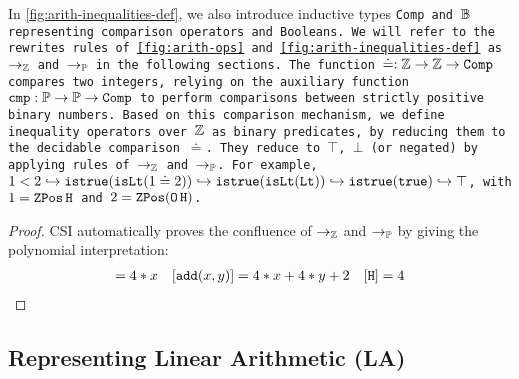 In \cref{fig:arith-inequalities-def}, we also introduce inductive types \tt{Comp}  and $\B$ representing comparison operators and Booleans.
We will refer to the rewrites rules of \cref{fig:arith-ops} and \cref{fig:arith-inequalities-def} as $\ra_\Z$ and $\ra_\bb{P}$ in the following sections.
The function $\doteq : \Z \to \Z \to \texttt{Comp}$ compares two integers, relying on the auxiliary function $\texttt{cmp} : \bb{P} \to \bb{P} \to \texttt{Comp}$ to perform comparisons between strictly positive binary numbers.
Based on this comparison mechanism, we define inequality operators over $\Z$ as binary predicates, by reducing them to the decidable comparison $\doteq$. They reduce to $\top$, $\bot$ (or negated) by applying rules of $\ra_\Z$ and $\ra_\bb{P}$.
For example, $1 < 2 \hookrightarrow \tt{istrue}(\tt{isLt}(1 \doteq 2)) \hookrightarrow \tt{istrue}(\tt{isLt}(\tt{Lt})) \hookrightarrow \tt{istrue}(\tt{true}) \hookrightarrow \top$, with $1 = \mathop{\ZPos} \tt{H}$ and $2 = \mathop{\ZPos} (\mathop{\tt{O}} \tt{H})$.

\begin{lemma}
\begin{proof}
CSI \cite{CSI} automatically proves the confluence of $\ra_\bb{Z}$ and $\ra_\bb{P}$ by giving the polynomial interpretation:
\begin{align*}
[\tt{succ}(x)] = 4*x & &[\tt{add}(x, y)] = 4 * x + 4 * y + 2  & &[ {\tt{H}} ] = 4 \\
\end{align*}
\end{proof}
\label{lemma:confluenceZP}
\end{lemma}


\subsection{Representing Linear Arithmetic (\textbf{LA})}
\label{ssec:encoding-la}

